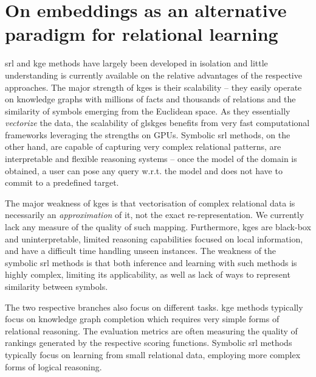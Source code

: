 \section{On embeddings as an alternative paradigm for relational learning}






\gls{srl} and \gls{kge} methods have largely been developed in isolation and little understanding is currently available on the relative advantages of the respective approaches.
The major strength of \gls{kge}s is their scalability -- they easily operate on knowledge graphs with millions of facts and thousands of relations and the similarity of symbols emerging from the Euclidean space.
As they essentially \textit{vectorize} the data, the scalability of gls{kge}s benefits from very fast computational frameworks leveraging the strengths on GPUs.
Symbolic \gls{srl} methods, on the other hand, are capable of capturing very complex relational patterns, are interpretable and flexible reasoning systems -- once the model of the domain is obtained, a user can pose any query w.r.t. the model and does not have to commit to a predefined target.



The major weakness of \gls{kge}s is that vectorisation of complex relational data is necessarily an \textit{approximation} of it, not the exact re-representation.
We currently lack any measure of the quality of such mapping.
Furthermore, \gls{kge}s are black-box and uninterpretable, limited reasoning capabilities focused on local information, and have a difficult time handling unseen instances.
The weakness of the symbolic \gls{srl} methods is that both inference and learning with such methods is highly complex, limiting its applicability, as well as lack of ways to represent similarity between symbols.



The two respective branches also focus on different tasks.
\gls{kge} methods typically focus on knowledge graph completion which requires very simple forms of relational reasoning. The evaluation metrics are often measuring the quality of rankings generated by the respective scoring functions.
Symbolic \gls{srl} methods typically focus on learning from small relational data, employing more complex forms of logical reasoning.






